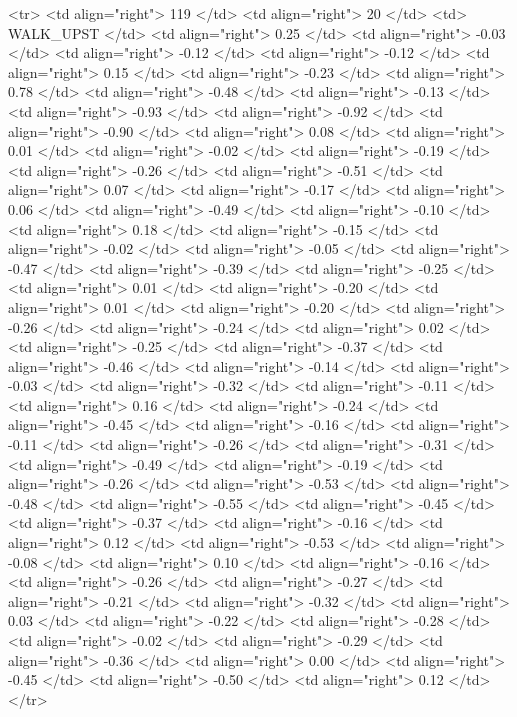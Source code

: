   <tr> <td align="right"> 119 </td> <td align="right">  20 </td> <td> WALK_UPST </td> <td align="right"> 0.25 </td> <td align="right"> -0.03 </td> <td align="right"> -0.12 </td> <td align="right"> -0.12 </td> <td align="right"> 0.15 </td> <td align="right"> -0.23 </td> <td align="right"> 0.78 </td> <td align="right"> -0.48 </td> <td align="right"> -0.13 </td> <td align="right"> -0.93 </td> <td align="right"> -0.92 </td> <td align="right"> -0.90 </td> <td align="right"> 0.08 </td> <td align="right"> 0.01 </td> <td align="right"> -0.02 </td> <td align="right"> -0.19 </td> <td align="right"> -0.26 </td> <td align="right"> -0.51 </td> <td align="right"> 0.07 </td> <td align="right"> -0.17 </td> <td align="right"> 0.06 </td> <td align="right"> -0.49 </td> <td align="right"> -0.10 </td> <td align="right"> 0.18 </td> <td align="right"> -0.15 </td> <td align="right"> -0.02 </td> <td align="right"> -0.05 </td> <td align="right"> -0.47 </td> <td align="right"> -0.39 </td> <td align="right"> -0.25 </td> <td align="right"> 0.01 </td> <td align="right"> -0.20 </td> <td align="right"> 0.01 </td> <td align="right"> -0.20 </td> <td align="right"> -0.26 </td> <td align="right"> -0.24 </td> <td align="right"> 0.02 </td> <td align="right"> -0.25 </td> <td align="right"> -0.37 </td> <td align="right"> -0.46 </td> <td align="right"> -0.14 </td> <td align="right"> -0.03 </td> <td align="right"> -0.32 </td> <td align="right"> -0.11 </td> <td align="right"> 0.16 </td> <td align="right"> -0.24 </td> <td align="right"> -0.45 </td> <td align="right"> -0.16 </td> <td align="right"> -0.11 </td> <td align="right"> -0.26 </td> <td align="right"> -0.31 </td> <td align="right"> -0.49 </td> <td align="right"> -0.19 </td> <td align="right"> -0.26 </td> <td align="right"> -0.53 </td> <td align="right"> -0.48 </td> <td align="right"> -0.55 </td> <td align="right"> -0.45 </td> <td align="right"> -0.37 </td> <td align="right"> -0.16 </td> <td align="right"> 0.12 </td> <td align="right"> -0.53 </td> <td align="right"> -0.08 </td> <td align="right"> 0.10 </td> <td align="right"> -0.16 </td> <td align="right"> -0.26 </td> <td align="right"> -0.27 </td> <td align="right"> -0.21 </td> <td align="right"> -0.32 </td> <td align="right"> 0.03 </td> <td align="right"> -0.22 </td> <td align="right"> -0.28 </td> <td align="right"> -0.02 </td> <td align="right"> -0.29 </td> <td align="right"> -0.36 </td> <td align="right"> 0.00 </td> <td align="right"> -0.45 </td> <td align="right"> -0.50 </td> <td align="right"> 0.12 </td> </tr>
